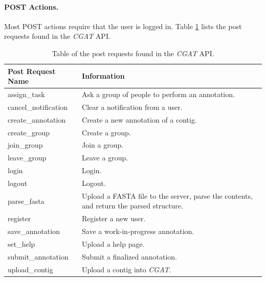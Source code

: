 \documentclass[12pt]{ucthesis}
\begin{document}
\paragraph{POST Actions.}
Most POST actions require that the user is logged in. Table \ref{tab:post_requests} lists
the post requests found in the \textit{CGAT} API.


\begin{table}[H]
   \centering
      \begin{tabular}{| l | p{10cm} |}
         \hline
            {\textbf{Post Request Name}} &
            {\textbf{Information}} \\
         \hline
            assign\_task & Ask a group of people to perform an annotation. \\
         \hline
             cancel\_notification  & Clear a notification from a user. \\
         \hline
            create\_annotation & Create a new annotation of a contig. \\
         \hline
            create\_group & Create a group. \\
         \hline
            join\_group & Join a group. \\
         \hline
            leave\_group &  Leave a group. \\
         \hline
            login & Login. \\
         \hline
            logout           & Logout.  \\
         \hline
            parse\_fasta  & Upload a FASTA file to the server, parse the contents, and return the parsed structure.  \\
         \hline
            register      & Register a new user.  \\
         \hline
            save\_annotation           & Save a work-in-progress annotation. \\
         \hline
            set\_help              & Upload a help page. \\
         \hline
            submit\_annotation              & Submit a finalized annotation. \\
         \hline
            upload\_contig              & Upload a contig into \textit{CGAT}. \\
         \hline
      \end{tabular}
      \caption{Table of the post requests found in the \textit{CGAT} API.}
      \label{tab:post_requests}
\end{table}
\end{document}
